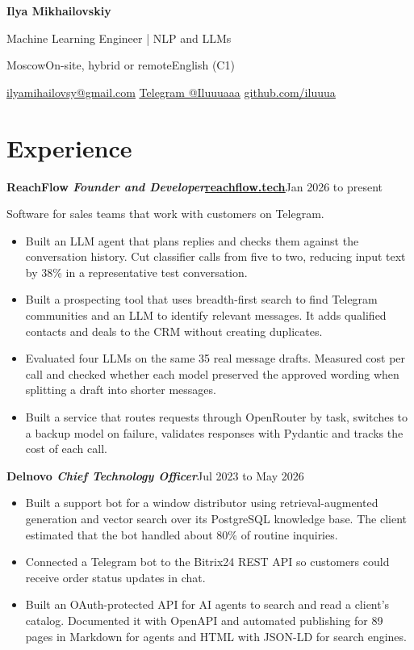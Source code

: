 \documentclass[10pt,a4paper]{article}
\newcommand{\role}[2]{\textbf{#1}\hfill{\small #2}\par}
\newcommand{\sep}{\enspace\textbar\enspace}
\begin{document}
\fontsize{10.3}{12.2}\selectfont
{\centering
  {\fontsize{23}{26}\selectfont\bfseries Ilya Mikhailovskiy}\par
  \vspace{1.5pt}
  {\large Machine Learning Engineer | NLP and LLMs}\par
  \vspace{2pt}
  Moscow\sep On-site, hybrid or remote\sep English (C1)\par
  \href{mailto:ilyamihailovsy@gmail.com}{\underline{ilyamihailovsy@gmail.com}}\sep
  \href{https://t.me/Iluuuaaa}{\underline{Telegram @Iluuuaaa}}\sep
  \href{https://github.com/iluuua}{\underline{github.com/iluuua}}\par
}

\section{Experience}
\role{ReachFlow \normalfont\enspace\textit{Founder and Developer}\enspace\href{https://reachflow.tech}{\underline{reachflow.tech}}}{Jan 2026 to present}
Software for sales teams that work with customers on Telegram.
\begin{itemize}
  \item Built an LLM agent that plans replies and checks them against the conversation history. Cut classifier calls from five to two, reducing input text by 38\% in a representative test conversation.
  \item Built a prospecting tool that uses breadth-first search to find Telegram communities and an LLM to identify relevant messages. It adds qualified contacts and deals to the CRM without creating duplicates.
  \item Evaluated four LLMs on the same 35 real message drafts. Measured cost per call and checked whether each model preserved the approved wording when splitting a draft into shorter messages.
  \item Built a service that routes requests through OpenRouter by task, switches to a backup model on failure, validates responses with Pydantic and tracks the cost of each call.
\end{itemize}

\vspace{3pt}
\role{Delnovo \normalfont\enspace\textit{Chief Technology Officer}}{Jul 2023 to May 2026}
\begin{itemize}
  \item Built a support bot for a window distributor using retrieval-augmented generation and vector search over its PostgreSQL knowledge base. The client estimated that the bot handled about 80\% of routine inquiries.
  \item Connected a Telegram bot to the Bitrix24 REST API so customers could receive order status updates in chat.
  \item Built an OAuth-protected API for AI agents to search and read a client's catalog. Documented it with OpenAPI and automated publishing for 89 pages in Markdown for agents and HTML with JSON-LD for search engines.
\end{itemize}
\end{document}
